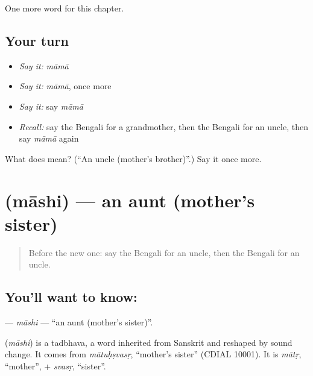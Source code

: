 \begin{grammarlens}[title={What you've built}]
One more word for this chapter.
\end{grammarlens}

\subsection*{Your turn}
\begin{itemize}
\raggedright
  \item \emph{Say it:} \emph{māmā}
  \item \emph{Say it:} \emph{māmā}, once more
  \item \emph{Say it:} say \emph{māmā}
  \item \emph{Recall:} say the Bengali for a grandmother, then the Bengali for an uncle, then say \emph{māmā} again
\end{itemize}

\begin{tcolorbox}[breakable,colback=teal!4,colframe=teal!35!black,title={Before you move on}]
What does  mean? (\textquotedblleft{}An uncle (mother's brother)\textquotedblright{}.) Say it once more.
\end{tcolorbox}
\section[\texorpdfstring{\bn{মাসি} (māshi)}{মাসি (māshi)}]{ (māshi) — an aunt (mother's sister)}

\label{lesson:BN-C46-mashi}



\begin{quote}
Before the new one: say the Bengali for an uncle, then the Bengali for an uncle.
\end{quote}

\subsection*{You'll want to know: }
\textbf{} — \emph{māshi} — \textquotedblleft{}an aunt (mother's sister)\textquotedblright{}.

\begin{cousinweb}
\textbf{} (\emph{māshi}) is a tadbhava, a word inherited from Sanskrit and reshaped by sound change. It comes from \emph{mātuḥṣvasṛ}, \textquotedblleft{}mother's sister\textquotedblright{} (CDIAL 10001). It is \emph{mātṛ}, \textquotedblleft{}mother\textquotedblright{}, + \emph{svasṛ}, \textquotedblleft{}sister\textquotedblright{}.
\end{cousinweb}

